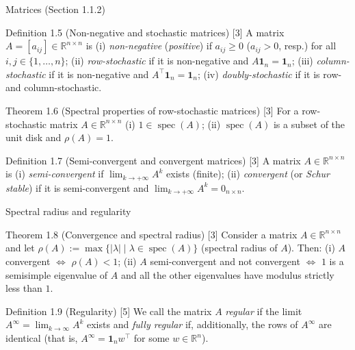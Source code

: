 \begin{frame}[label=bk-prelim]{Matrices (Section 1.1.2)}
  \scriptsize
  \begin{block}{Definition 1.5 (Non-negative and stochastic matrices) [3]}
    A matrix $A = [a_{ij}] \in \mathbb{R}^{n \times n}$ is
    (i) \emph{non-negative} (\emph{positive}) if $a_{ij} \geq 0$ ($a_{ij} > 0$, resp.) for
    all $i, j \in \{1, \dots, n\}$;
    (ii) \emph{row-stochastic} if it is non-negative and $A \mathbf{1}_n = \mathbf{1}_n$;
    (iii) \emph{column-stochastic} if it is non-negative and
    $A^\top \mathbf{1}_n = \mathbf{1}_n$;
    (iv) \emph{doubly-stochastic} if it is row- and column-stochastic.
  \end{block}
  \begin{block}{Theorem 1.6 (Spectral properties of row-stochastic matrices) [3]}
    For a row-stochastic matrix $A \in \mathbb{R}^{n \times n}$
    (i) $1 \in \operatorname{spec}(A)$;
    (ii) $\operatorname{spec}(A)$ is a subset of the unit disk and $\rho(A) = 1$.
  \end{block}
  \begin{block}{Definition 1.7 (Semi-convergent and convergent matrices) [3]}
    A matrix $A \in \mathbb{R}^{n \times n}$ is
    (i) \emph{semi-convergent} if $\lim_{k \to +\infty} A^k$ exists (finite);
    (ii) \emph{convergent} (or \emph{Schur stable}) if it is semi-convergent and
    $\lim_{k \to +\infty} A^k = 0_{n \times n}$.
  \end{block}
\end{frame}

\begin{frame}[label=bk-prelim-b]{Spectral radius and regularity}
  \scriptsize
  \begin{block}{Theorem 1.8 (Convergence and spectral radius) [3]}
    Consider a matrix $A \in \mathbb{R}^{n \times n}$ and let
    $\rho(A) := \max\{|\lambda| \mid \lambda \in \operatorname{spec}(A)\}$ (spectral radius
    of $A$). Then:
    (i) $A$ convergent $\iff$ $\rho(A) < 1$;
    (ii) $A$ semi-convergent and not convergent $\iff$ $1$ is a semisimple eigenvalue of
    $A$ and all the other eigenvalues have modulus strictly less than $1$.
  \end{block}
  \begin{block}{Definition 1.9 (Regularity) [5]}
    We call the matrix $A$ \emph{regular} if the limit $A^\infty = \lim_{k \to \infty} A^k$
    exists and \emph{fully regular} if, additionally, the rows of $A^\infty$ are identical
    (that is, $A^\infty = \mathbf{1}_n w^\top$ for some $w \in \mathbb{R}^n$).
  \end{block}
\end{frame}

